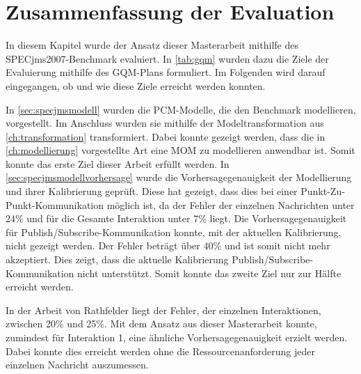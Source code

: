 \section{Zusammenfassung der Evaluation}
\label{sec:evaluationzusammenfassung}
In diesem Kapitel wurde der Ansatz dieser Masterarbeit mithilfe des SPECjms2007-Benchmark evaluiert. In \autoref{tab:gqm} wurden dazu die Ziele der Evaluierung mithilfe des GQM-Plans formuliert. Im Folgenden wird darauf eingegangen, ob und wie diese Ziele erreicht werden konnten. \par
In \autoref{sec:specjmsmodell} wurden die PCM-Modelle, die den Benchmark modellieren, vorgestellt. Im Anschluss wurden sie mithilfe der Modeltransformation aus \autoref{ch:transformation} transformiert. Dabei konnte gezeigt werden, dass die in \autoref{ch:modellierung} vorgestellte Art eine MOM zu modellieren anwendbar ist. Somit konnte das erste Ziel dieser Arbeit erfüllt werden. 
In \autoref{sec:specjmsmodellvorhersage} wurde die Vorhersagegenauigkeit der Modellierung und ihrer Kalibrierung geprüft. Diese hat gezeigt, dass dies bei einer Punkt-Zu-Punkt-Kommunikation möglich ist, da der Fehler der einzelnen Nachrichten unter 24\% und für die Gesamte Interaktion unter 7\% liegt. Die Vorhersagegenauigkeit für Publish/Subscribe-Kommunikation konnte, mit der aktuellen Kalibrierung, nicht gezeigt werden. Der Fehler beträgt über 40\% und ist somit nicht mehr akzeptiert. Dies zeigt, dass die aktuelle Kalibrierung Publish/Subscribe-Kommunikation nicht unterstützt. Somit konnte das zweite Ziel nur zur Hälfte erreicht werden. \par
In der Arbeit von Rathfelder \cite{Rathfelder2013} liegt der Fehler, der einzelnen Interaktionen, zwischen 20\% und 25\%. Mit dem Ansatz aus dieser Masterarbeit konnte, zumindest für Interaktion 1, eine ähnliche Vorhersagegenauigkeit erzielt werden. Dabei konnte dies erreicht werden ohne die Ressourcenanforderung jeder einzelnen Nachricht auszumessen. 



